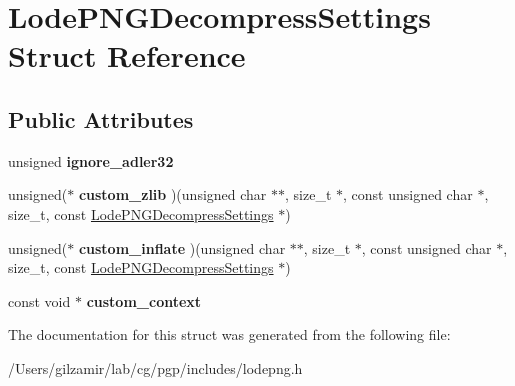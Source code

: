 \hypertarget{struct_lode_p_n_g_decompress_settings}{}\section{Lode\+P\+N\+G\+Decompress\+Settings Struct Reference}
\label{struct_lode_p_n_g_decompress_settings}
\subsection*{Public Attributes}
\begin{DoxyCompactItemize}
\item 
\mbox{\label{struct_lode_p_n_g_decompress_settings_afab4b919650b51b4d2f175a60ed6c580}} 
unsigned {\bfseries ignore\+\_\+adler32}
\item 
\mbox{\label{struct_lode_p_n_g_decompress_settings_a9dd432e46330dbd2ce3ef1929c64337d}} 
unsigned($\ast$ {\bfseries custom\+\_\+zlib} )(unsigned char $\ast$$\ast$, size\+\_\+t $\ast$, const unsigned char $\ast$, size\+\_\+t, const \mbox{\hyperlink{struct_lode_p_n_g_decompress_settings}{Lode\+P\+N\+G\+Decompress\+Settings}} $\ast$)
\item 
\mbox{\label{struct_lode_p_n_g_decompress_settings_a023aa5946c99934d40280850a4d8b204}} 
unsigned($\ast$ {\bfseries custom\+\_\+inflate} )(unsigned char $\ast$$\ast$, size\+\_\+t $\ast$, const unsigned char $\ast$, size\+\_\+t, const \mbox{\hyperlink{struct_lode_p_n_g_decompress_settings}{Lode\+P\+N\+G\+Decompress\+Settings}} $\ast$)
\item 
\mbox{\label{struct_lode_p_n_g_decompress_settings_a66e3608b541c64bb275c0ac1a80c3ec6}} 
const void $\ast$ {\bfseries custom\+\_\+context}
\end{DoxyCompactItemize}


The documentation for this struct was generated from the following file\+:\begin{DoxyCompactItemize}
\item 
/\+Users/gilzamir/lab/cg/pgp/includes/lodepng.\+h\end{DoxyCompactItemize}
